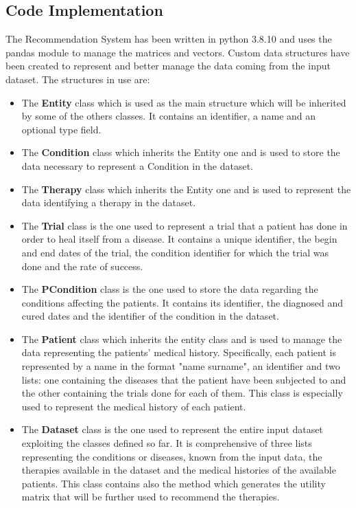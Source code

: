 \subsection{Code Implementation}
The Recommendation System has been written in python 3.8.10 and uses the
pandas module\cite{Pandas} to manage the matrices and vectors.
Custom data structures have been created to represent and better manage the
data coming from the input dataset.
The structures in use are:
\begin{itemize}
		\item The \textbf{Entity} class which is used as the main structure
		      which will be inherited by some of the others classes. It
		      contains an identifier, a name and an optional type field.
		\item The \textbf{Condition} class which inherits the Entity one and
				is used to store the data necessary to represent a Condition
				in the dataset.
		\item The \textbf{Therapy} class which inherits the Entity one and
				is used to represent the data identifying a therapy in the 
				dataset.
		\item The \textbf{Trial} class is the one used to represent a
				trial that a patient has done in order to heal itself from a
				disease. It contains a unique identifier, the begin and end 
				dates of the trial, the condition identifier for which the
				trial was done and the rate of success.
		\item The \textbf{PCondition} class is the one used to store the
				data regarding the conditions affecting the patients. It
				contains its identifier, the diagnosed and cured dates
				and the identifier of the condition in the dataset.
		\item The \textbf{Patient} class which inherits the entity class and is
				used to manage the data representing the patients' medical
				history.
				Specifically, each patient is represented by a name
				in the format "name surname", an identifier
				and two lists: one containing the diseases that
				the patient have been subjected to and the other containing
				the trials done for each of them. This class is especially
				used to represent the medical history of each patient.
		\item The \textbf{Dataset} class is the one used to represent the
				entire input dataset exploiting the classes defined so far.
				It is comprehensive of three lists representing the conditions
				or diseases, known from the input data, the therapies available
				in the dataset and the medical histories of the available
				patients.
				This class contains also the method which generates the utility
				matrix that will be further used to recommend the therapies.
\end{itemize}
